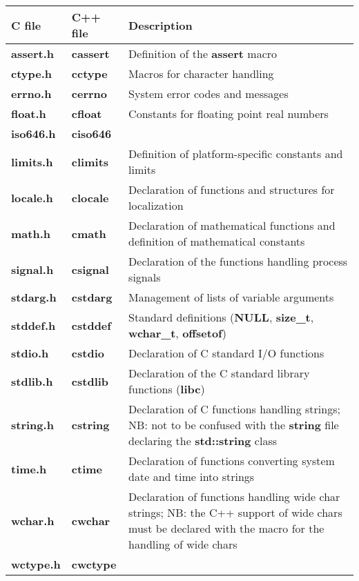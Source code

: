 \begin{tabular}{|l|l|p{12cm}|}
  \hline \textbf{C file} & \textbf{C++ file} & \textbf{Description} \\
  \hline {\bf assert.h} & {\bf cassert} & Definition of the {\bf assert} macro \\
  \hline {\bf ctype.h} & {\bf cctype} & Macros for character handling \\
  \hline {\bf errno.h} & {\bf cerrno} & System error codes and messages \\
  \hline {\bf float.h} & {\bf cfloat} & Constants for floating point real numbers \\
  \hline {\bf iso646.h} & {\bf ciso646} &  \\
  \hline {\bf limits.h} & {\bf climits} & Definition of platform-specific constants and limits \\
  \hline {\bf locale.h} & {\bf clocale} & Declaration of functions and structures for localization \\
  \hline {\bf math.h} & {\bf cmath} & Declaration of mathematical functions and definition of mathematical constants \\
  \hline {\bf signal.h} & {\bf csignal} & Declaration of the functions handling process signals \\
  \hline {\bf stdarg.h} & {\bf cstdarg} & Management of lists of variable arguments \\
  \hline {\bf stddef.h} & {\bf cstddef} & Standard definitions ({\bf NULL}, {\bf size\_t}, {\bf wchar\_t}, {\bf offsetof}) \\
  \hline {\bf stdio.h} & {\bf cstdio} & Declaration of C standard I/O functions \\
  \hline {\bf stdlib.h} & {\bf cstdlib} & Declaration of the C standard library functions ({\bf libc}) \\
  \hline {\bf string.h} & {\bf cstring} & Declaration of C functions handling strings; NB: not to be confused with the {\bf string} file declaring the {\bf std::string} class \\
  \hline {\bf time.h} & {\bf ctime} & Declaration of functions converting system date and time into strings \\
  \hline {\bf wchar.h} & {\bf cwchar} & Declaration of functions handling wide char strings; NB: the C++ support of wide chars must be declared with the macro for the handling of wide chars \\
  \hline {\bf wctype.h} & {\bf cwctype} & \\
  \hline
\end{tabular}

